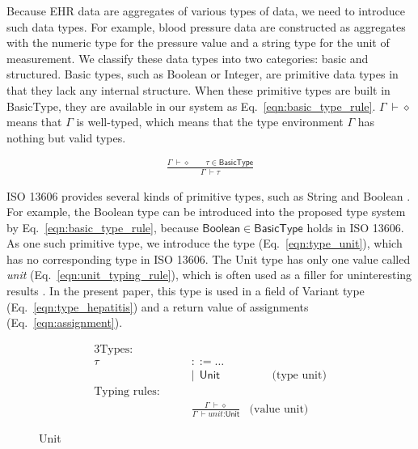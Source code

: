 \documentclass[preprint,3p,onecolumn,times,review]{article}
\begin{document}
{Because EHR data are aggregates of various types of data, we need to introduce such data types.
For example, blood pressure data are constructed as aggregates with the numeric type for the pressure value and a string type for the unit of measurement.
We classify these data types into two categories: basic and structured.
Basic types, such as Boolean or Integer,  are primitive data types in that they lack any internal structure.
When these primitive types are built in BasicType, they are available in our system as Eq.~\ref{eqn:basic_type_rule}.
$\Gamma~ \vdash \diamond$ means that $\Gamma$ is well-typed, which means that the type environment $\Gamma$ has nothing but valid types.
  
\begin{figure}[!htbp]
  \begin{align}
    \frac{\Gamma~ \vdash \diamond \qquad \tau \in \mathsf{BasicType}}
    {\Gamma~ \vdash \tau} \label{eqn:basic_type_rule}
  \end{align}
\end{figure}

ISO 13606 provides several kinds of primitive types, such as {\sf String} and {\sf Boolean} \cite[p.42]{iso08:13606_healt_elect_part1}.
For example, the {\sf Boolean} type can be introduced into the proposed type system by Eq.~\ref{eqn:basic_type_rule}, because $\mathsf{Boolean} \in \mathsf{BasicType}$ holds in ISO 13606.
As one such primitive type, we introduce the {} type (Eq.~\ref{eqn:type_unit}), which has no corresponding type in ISO 13606.
The Unit type has only one value called {\it{unit}} (Eq.~\ref{eqn:unit_typing_rule}), which is often used as a filler for uninteresting results \cite{cardelli04:_type_system,pierce02:_types_progr_languag}.
In the present paper, this type is used in a field of Variant type (Eq.~\ref{eqn:type_hepatitis}) and a return value of assignments (Eq.~{\ref{eqn:assignment}}).


\begin{figure}[!htbp]
\begin{alignat}{3}
  \text{Types:} \qquad   \nonumber\\
                        \tau~ & {::= \dots }\nonumber\\
                              & | ~~ \mathsf{Unit}                                & \qquad \label{eqn:type_unit} \text{(type unit)}\\
  \text{Typing rules:} \qquad   \nonumber\\
                              & \frac{\Gamma~ \vdash \diamond }
                                      {\Gamma ~ \vdash unit \text{:}\mathsf{Unit}} & \label{eqn:unit_typing_rule} \text{(value unit)}
\end{alignat}
\caption{Unit}\label{fig:unit_type}
\end{figure}

}
\end{document}
